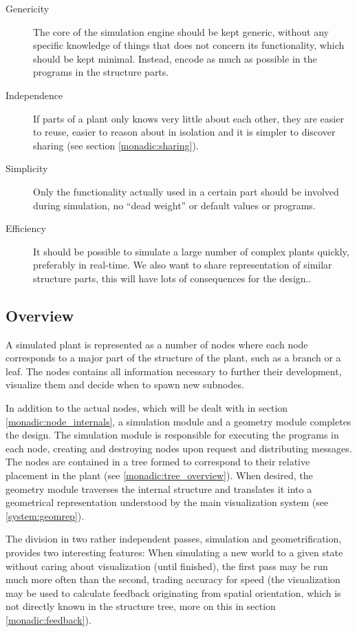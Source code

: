 \begin{description}
\item[Genericity]
    The core of the simulation engine should be kept generic, without 
    any specific knowledge of things that does not concern its
    functionality, which should be kept minimal. Instead, encode as
    much as possible in the programs in the structure parts.
\item[Independence]
    If parts of a plant only knows very little about each
    other, they are easier to reuse, easier to reason about in
    isolation and it is simpler to discover sharing (see
    section \ref{monadic:sharing}).
\item[Simplicity]
    Only the functionality actually used in a certain part
    should be involved during simulation, no ``dead weight'' or
    default values or programs.
\item[Efficiency] 
    It should be possible to simulate a large number of
    complex plants quickly, preferably in real-time.
    We also want to share representation of similar
    structure parts, this will have lots of consequences for
    the design..

\end{description}

\subsection{Overview}


    A simulated plant is represented as a number of nodes where each
    node corresponds to a major part of the structure of the plant,
    such as a branch or a leaf. The nodes contains all information
    necessary to further their development, visualize them and decide
    when to spawn new subnodes.

    In addition to the actual nodes, which will be dealt with in
    section \ref{monadic:node_internals}, a simulation module and a
    geometry module completes the design. The simulation module
    is responsible for executing the programs in each node, creating
    and destroying nodes upon request and distributing messages. The
    nodes are contained in a tree formed to correspond to their
    relative placement in the plant (see \ref{monadic:tree_overview}). When
    desired, the geometry module traverses the internal structure
    and translates it into a geometrical representation understood by
    the main visualization system (see \ref{system:geomrep}).

    The division in two rather independent passes, simulation and
    geometrification, provides two interesting features:
    When simulating a new world to a given state without
    caring about visualization (until finished), the
    first pass may be run much more often than the
    second, trading accuracy for speed (the visualization
    may be used to calculate feedback originating from
    spatial orientation, which is not directly known in the
    structure tree, more on this in section
    \ref{monadic:feedback}).

